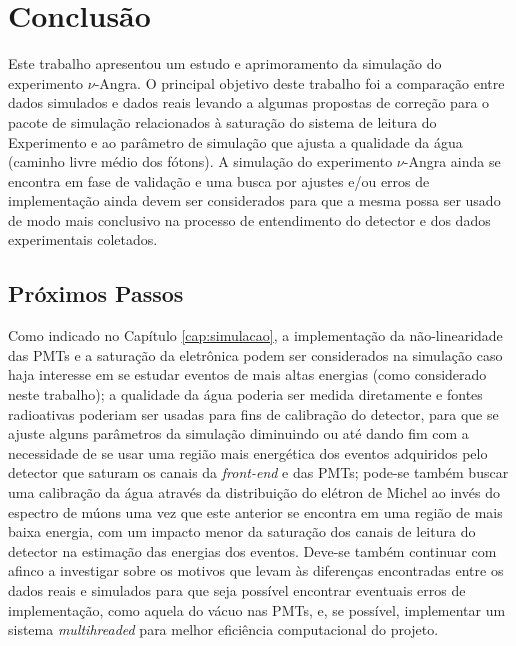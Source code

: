 \chapter{Conclusão} \label{cap:conclusao}
\vspace{-2cm}

Este trabalho apresentou um estudo e aprimoramento da simulação do experimento $\nu$-Angra. O principal objetivo deste trabalho foi a comparação entre dados simulados e dados reais levando a algumas propostas de correção para o pacote de simulação relacionados à saturação do sistema de leitura do Experimento e ao parâmetro de simulação que ajusta a qualidade da água (caminho livre médio dos fótons). A simulação do experimento $\nu$-Angra ainda se encontra em fase de validação e uma busca por ajustes e/ou erros de implementação ainda devem ser considerados para que a mesma possa ser usado de modo mais conclusivo na processo de entendimento do detector e dos dados experimentais coletados.

\section{Próximos Passos}

Como indicado no Capítulo \ref{cap:simulacao}, a implementação da não-linearidade das PMTs e a saturação da eletrônica podem ser considerados na simulação caso haja interesse em se estudar eventos de mais altas energias (como considerado neste trabalho); a qualidade da água poderia ser medida diretamente e fontes radioativas poderiam ser usadas para fins de calibração do detector, para que se ajuste alguns parâmetros da simulação diminuindo ou até dando fim com a necessidade de se usar uma região mais energética dos eventos adquiridos pelo detector que saturam os canais da \textit{front-end} e das PMTs; pode-se também buscar uma calibração da água através da distribuição do elétron de Michel ao invés do espectro de múons uma vez que este anterior se encontra em uma região de mais baixa energia, com um impacto menor da saturação dos canais de leitura do detector na estimação das energias dos eventos. Deve-se também continuar com afinco a investigar sobre os motivos que levam às diferenças encontradas entre os dados reais e simulados para que seja possível encontrar eventuais erros de implementação, como aquela do vácuo nas PMTs, e, se possível, implementar um sistema \emph{multihreaded} para melhor eficiência computacional do projeto.